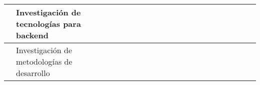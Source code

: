 \begin{landscape}
\begin{ThreePartTable}
\begin{longtable}{|p{}|p{5.5cm}|p{4cm}|l|l|l|l|l|l|l|l|l|l|l|l|l|l|l|l|l|l|l|}
            \cline{2-2}\cline{4-21}
                                                                                & Investigación de tecnologías para backend                           &                                                                                                                     &                                       & \cellcolor{green!25}                  &                                       &                                       &                      &                      &                      &                      &                      &                      &                      &                      &                      &                      &                      \\
            \cline{2-2}\cline{4-21}
            \hline                                                              & Investigación de metodologías de desarrollo                         &                                                                                                                     &                                       & \cellcolor{green!25}                  &                                       &                                       &                      &                      &                      &                      &                      &                      &                      &                      &                      &                      &                      \\


\end{longtable}
\end{ThreePartTable}
\end{landscape}
